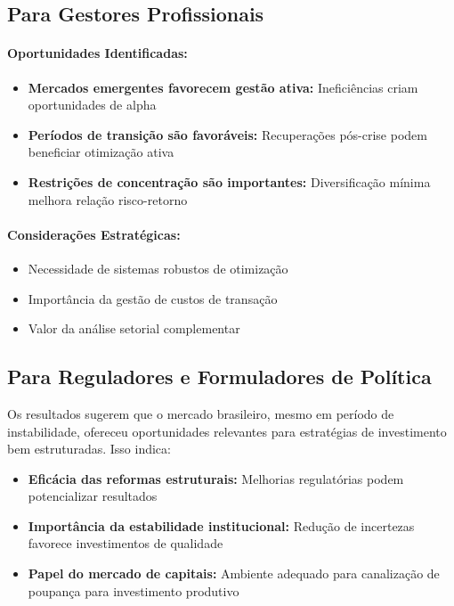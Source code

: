 \subsection{Para Gestores Profissionais}

\paragraph{Oportunidades Identificadas:}
\begin{itemize}
    \item \textbf{Mercados emergentes favorecem gestão ativa:} Ineficiências criam oportunidades de alpha
    \item \textbf{Períodos de transição são favoráveis:} Recuperações pós-crise podem beneficiar otimização ativa
    \item \textbf{Restrições de concentração são importantes:} Diversificação mínima melhora relação risco-retorno
\end{itemize}

\paragraph{Considerações Estratégicas:}
\begin{itemize}
    \item Necessidade de sistemas robustos de otimização
    \item Importância da gestão de custos de transação
    \item Valor da análise setorial complementar
\end{itemize}

\subsection{Para Reguladores e Formuladores de Política}

Os resultados sugerem que o mercado brasileiro, mesmo em período de instabilidade, ofereceu oportunidades relevantes para estratégias de investimento bem estruturadas. Isso indica:

\begin{itemize}
    \item \textbf{Eficácia das reformas estruturais:} Melhorias regulatórias podem potencializar resultados
    \item \textbf{Importância da estabilidade institucional:} Redução de incertezas favorece investimentos de qualidade
    \item \textbf{Papel do mercado de capitais:} Ambiente adequado para canalização de poupança para investimento produtivo
\end{itemize}

